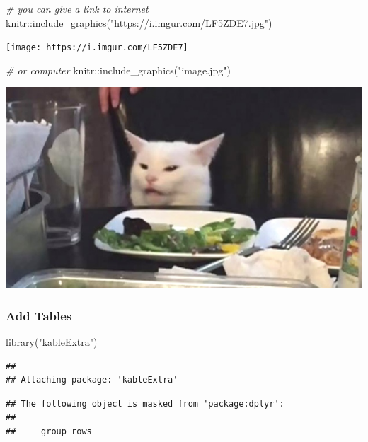 \documentclass[
]{article}
\newenvironment{Shaded}{\begin{snugshade}}{\end{snugshade}}
\newcommand{\CommentTok}[1]{\textcolor[rgb]{0.56,0.35,0.01}{\textit{#1}}}
\newcommand{\FunctionTok}[1]{\textcolor[rgb]{0.00,0.00,0.00}{#1}}
\newcommand{\NormalTok}[1]{#1}
\newcommand{\SpecialCharTok}[1]{\textcolor[rgb]{0.00,0.00,0.00}{#1}}
\newcommand{\StringTok}[1]{\textcolor[rgb]{0.31,0.60,0.02}{#1}}
\begin{document}
\begin{Shaded}
\begin{Highlighting}[]
\CommentTok{\# you can give a link to internet}
\NormalTok{knitr}\SpecialCharTok{::}\FunctionTok{include\_graphics}\NormalTok{(}\StringTok{"https://i.imgur.com/LF5ZDE7.jpg"}\NormalTok{)}
\end{Highlighting}
\end{Shaded}

\texttt{[image: https://i.imgur.com/LF5ZDE7]}

\begin{Shaded}
\begin{Highlighting}[]
\CommentTok{\# or computer}
\NormalTok{knitr}\SpecialCharTok{::}\FunctionTok{include\_graphics}\NormalTok{(}\StringTok{"image.jpg"}\NormalTok{)}
\end{Highlighting}
\end{Shaded}

\includegraphics{image.jpg}

\hypertarget{add-tables}{%
\subsubsection{Add Tables}\label{add-tables}}

\begin{Shaded}
\begin{Highlighting}[]
\FunctionTok{library}\NormalTok{(}\StringTok{"kableExtra"}\NormalTok{)}
\end{Highlighting}
\end{Shaded}

\begin{verbatim}
## 
## Attaching package: 'kableExtra'
\end{verbatim}

\begin{verbatim}
## The following object is masked from 'package:dplyr':
## 
##     group_rows
\end{verbatim}
\end{document}
